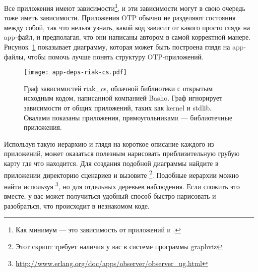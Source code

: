 Все приложения имеют зависимости\footnote{Как минимум --- это зависимость от приложений  и .}, и эти зависимости могут в свою очередь тоже иметь зависимости. Приложения OTP обычно не разделяют состояния между собой, так что нельзя узнать, какой код зависит от какого просто глядя на app-файл, и предполагая, что они написаны автором в самой корректной манере. Рисунок~\ref{fig:app-deps} показывает диаграмму, которая может быть построена глядя на app-файлы, чтобы помочь лучше понять структуру OTP-приложений.


\begin{figure}
  \texttt{[image: app-deps-riak-cs.pdf]}%
  \caption{Граф зависимостей riak\_cs, облачной библиотеки с открытым исходным кодом, написанной компанией Basho. Граф игнорирует зависимости от общих приложений, таких как kernel и stdlib. Овалами показаны приложения, прямоугольниками --- библиотечные приложения.}%
   \label{fig:app-deps}
\end{figure}

Используя такую иерархию и глядя на короткое описание каждого из приложений, может оказаться полезным нарисовать приблизительную грубую карту где что находится. Для создания подобной диаграммы найдите в приложении  директорию сценариев  и вызовите \footnote{Этот скрипт требует наличия у вас в системе программы graphviz}. Подобные иерархии можно найти используя \footnote{\href{http://www.erlang.org/doc/apps/observer/observer\_ug.html}{http://www.erlang.org/doc/apps/observer/observer\_ug.html}}, но для отдельных деревьев наблюдения. Если сложить это вместе, у вас может получиться удобный способ быстро нарисовать и разобраться, что происходит в незнакомом коде.


